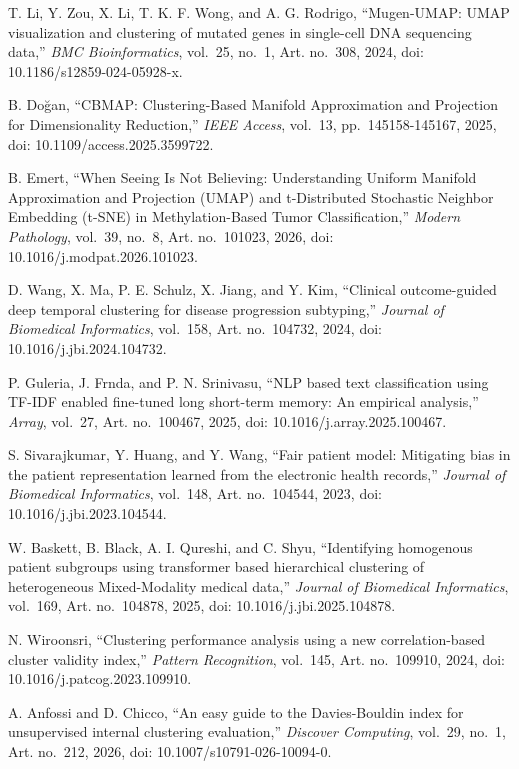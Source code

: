  T. Li, Y. Zou, X. Li, T. K. F. Wong, and A. G. Rodrigo, ``Mugen-UMAP: UMAP visualization and clustering of mutated genes in single-cell DNA sequencing data,'' \textit{BMC Bioinformatics}, vol.~25, no.~1, Art. no.~308, 2024, doi: 10.1186/s12859-024-05928-x.

 B. Doğan, ``CBMAP: Clustering-Based Manifold Approximation and Projection for Dimensionality Reduction,'' \textit{IEEE Access}, vol.~13, pp.~145158-145167, 2025, doi: 10.1109/access.2025.3599722.

 B. Emert, ``When Seeing Is Not Believing: Understanding Uniform Manifold Approximation and Projection (UMAP) and t-Distributed Stochastic Neighbor Embedding (t-SNE) in Methylation-Based Tumor Classification,'' \textit{Modern Pathology}, vol.~39, no.~8, Art. no.~101023, 2026, doi: 10.1016/j.modpat.2026.101023.

 D. Wang, X. Ma, P. E. Schulz, X. Jiang, and Y. Kim, ``Clinical outcome-guided deep temporal clustering for disease progression subtyping,'' \textit{Journal of Biomedical Informatics}, vol.~158, Art. no.~104732, 2024, doi: 10.1016/j.jbi.2024.104732.

 P. Guleria, J. Frnda, and P. N. Srinivasu, ``NLP based text classification using TF-IDF enabled fine-tuned long short-term memory: An empirical analysis,'' \textit{Array}, vol.~27, Art. no.~100467, 2025, doi: 10.1016/j.array.2025.100467.

 S. Sivarajkumar, Y. Huang, and Y. Wang, ``Fair patient model: Mitigating bias in the patient representation learned from the electronic health records,'' \textit{Journal of Biomedical Informatics}, vol.~148, Art. no.~104544, 2023, doi: 10.1016/j.jbi.2023.104544.

 W. Baskett, B. Black, A. I. Qureshi, and C. Shyu, ``Identifying homogenous patient subgroups using transformer based hierarchical clustering of heterogeneous Mixed-Modality medical data,'' \textit{Journal of Biomedical Informatics}, vol.~169, Art. no.~104878, 2025, doi: 10.1016/j.jbi.2025.104878.

 N. Wiroonsri, ``Clustering performance analysis using a new correlation-based cluster validity index,'' \textit{Pattern Recognition}, vol.~145, Art. no.~109910, 2024, doi: 10.1016/j.patcog.2023.109910.

 A. Anfossi and D. Chicco, ``An easy guide to the Davies-Bouldin index for unsupervised internal clustering evaluation,'' \textit{Discover Computing}, vol.~29, no.~1, Art. no.~212, 2026, doi: 10.1007/s10791-026-10094-0.

